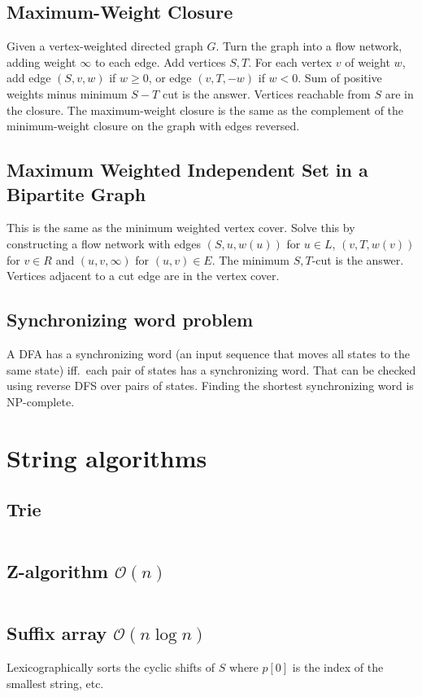 \documentclass[8pt,a4paper,landscape,oneside]{amsart}
\newcommand{\mintedstyle}[2]{\inputminted[fontsize=\normalsize,baselinestretch=.9,breaklines,tabsize=2]{#1}{code/#2}}
\newcommand{\code}[1]{\mintedstyle{cpp}{#1}}
\begin{document}
\begin{multicols*}{3}
\subsection{Maximum-Weight Closure}
Given a vertex-weighted directed graph $G$. Turn the graph into a flow
network, adding weight $\infty$ to each edge. Add vertices $S,T$. For
each vertex $v$ of weight $w$, add edge $(S,v,w)$ if $w\geq 0$, or edge
$(v,T,-w)$ if $w<0$. Sum of positive weights minus minimum $S-T$ cut is
the answer. Vertices reachable from $S$ are in the closure. The
maximum-weight closure is the same as the complement of the
minimum-weight closure on the graph with edges reversed.

\subsection{Maximum Weighted Independent Set in a Bipartite Graph}
This is the same as the minimum weighted vertex cover. Solve this by
constructing a flow network with edges $(S,u,w(u))$ for $u\in L$,
$(v,T,w(v))$ for $v\in R$ and $(u,v,\infty)$ for $(u,v)\in E$. The
minimum $S,T$-cut is the answer. Vertices adjacent to a cut edge are
in the vertex cover.

\subsection{Synchronizing word problem}
A DFA has a synchronizing word (an input sequence that moves all states
to the same state) iff.\ each pair of states has a synchronizing word.
That can be checked using reverse DFS over pairs of states. Finding the
shortest synchronizing word is NP-complete.

\section{String algorithms}
\subsection{Trie}
\code{strings/trie.cpp}

\subsection{Z-algorithm $\mathcal{O}(n)$}
\code{strings/z_function.cpp}

\subsection{Suffix array $\mathcal{O}(n \log{n})$}
Lexicographically sorts the cyclic shifts of $S$ where $p[0]$ is the index of the smallest string, etc.
\code{strings/suffixarray.cpp}


\end{multicols*}
\end{document}
